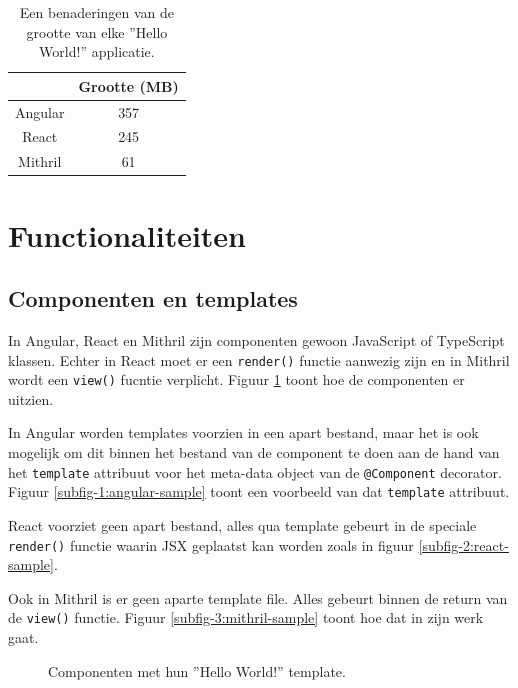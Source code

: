 \begin{table}
    \centering
    \begin{tabular}{|c|c|}
        \cline{2-2}
        \multicolumn{1}{c|}{} & Grootte (MB) \\ \hline
        Angular & 357 \\ \hline
        React & 245 \\ \hline
        Mithril & 61 \\ \hline
        
    \end{tabular}
    \caption{Een benaderingen van de grootte van elke ''Hello World!'' applicatie.}
    \label{table:grootte}
\end{table}

\section{Functionaliteiten}

\subsection{Componenten en templates}

In Angular, React en Mithril zijn componenten gewoon JavaScript of TypeScript klassen. Echter in React moet er een \texttt{render()} functie aanwezig zijn en in Mithril wordt een \texttt{view()} fucntie verplicht. Figuur \ref{fig:sample-components} toont hoe de componenten er uitzien. 

In Angular worden templates voorzien in een apart bestand, maar het is ook mogelijk om dit binnen het bestand van de component te doen aan de hand van het \texttt{template} attribuut voor het meta-data object van de \texttt{@Component} decorator. Figuur \ref{subfig-1:angular-sample} toont een voorbeeld van dat \texttt{template} attribuut.

React voorziet geen apart bestand, alles qua template gebeurt in de speciale \texttt{render()} functie waarin JSX geplaatst kan worden zoals in figuur \ref{subfig-2:react-sample}.

Ook in Mithril is er geen aparte template file. Alles gebeurt binnen de return van de \texttt{view()} functie. Figuur \ref{subfig-3:mithril-sample} toont hoe dat in zijn werk gaat.

\begin{figure}[!ht]
    \hfill
    \hfill
    \caption{Componenten met hun ''Hello World!'' template.}
    \label{fig:sample-components}
\end{figure}

